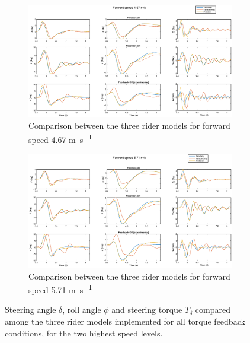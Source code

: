      \begin{figure}
        \centering
        \begin{subfigure}[b]{\textwidth}
            \centering
            \includegraphics[width=1\linewidth]{images/compare_models3.eps}
            \caption{Comparison between the three rider models for forward speed 4.67 \si{\meter\per\second}}
            \label{fig:results_compare3}
        \end{subfigure}
        \begin{subfigure}[b]{\textwidth}
            \centering
            \includegraphics[width=1\linewidth]{images/compare_models4.eps}
            \caption{Comparison between the three rider models for forward speed 5.71 \si{\meter\per\second}}            
            \label{fig:results_compare4}
        \end{subfigure}
        \caption{Steering angle \ensuremath{\delta}, roll angle \ensuremath{\phi} and steering torque \ensuremath{T_\delta} compared among the three rider models implemented for all torque feedback conditions, for the two highest speed levels.}
        \label{fig:results_compare34}
     \end{figure}


